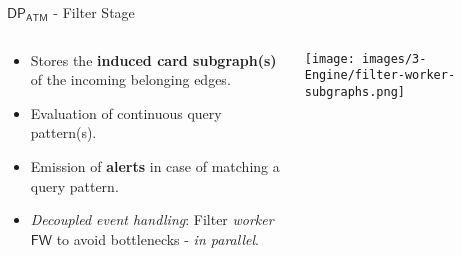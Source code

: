 \begin{comment}
        \node (down4) at (5.7, -2.55);
        \draw [[-{Stealth[length=4mm]}, visible on=<2->, alt=<2>{red}{black}] (4) to["log" '] (down4);
        
        \node (right4) at (7.4, 0);
        \draw [[-{Stealth[length=4mm]}, visible on=<2->, red] (4) to["Alerts"] (right4);
    \end{tikzpicture}
    \end{adjustwidth}
\end{frame}
\end{comment}

\begin{frame}{$\mathsf{DP_{ATM}}$ - Filter Stage}
    \begin{columns} %
        \begin{column}{0.5\textwidth}
            \begin{itemize}
                \item Stores the \textbf{induced card subgraph(s)} of the incoming belonging edges.
                \item Evaluation of continuous query pattern(s).
                \item Emission of \textbf{alerts} in case of matching a query pattern.
                \item \emph{Decoupled event handling}: Filter \emph{worker} $\mathsf{FW}$ to avoid bottlenecks - \emph{in parallel}.
            \end{itemize}
        \end{column}

        \begin{column}{0.6\textwidth}
            \centering
            \texttt{[image: images/3-Engine/filter-worker-subgraphs.png]}
        \end{column}
    \end{columns}
\end{frame}

